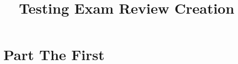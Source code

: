 \documentclass{xourse}
\title{Testing Exam Review Creation}
\begin{document}
\maketitle
\part{Part The First}
\chapterstyle
{}
\end{document}
